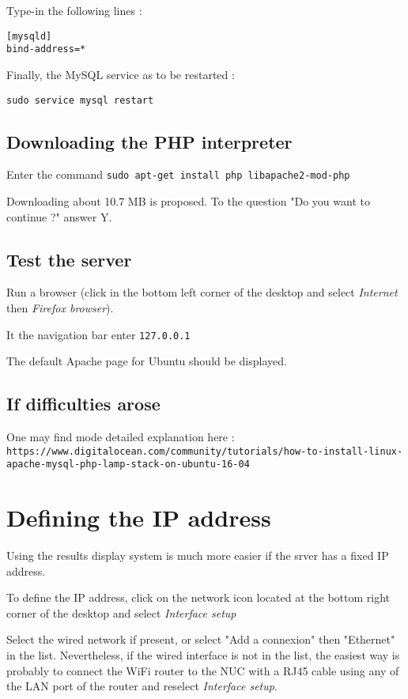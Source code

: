 \documentclass[a4paper]{ffco-rapport}
\begin{document}
		Type-in the following lines :

			\begin{verbatim}
[mysqld]
bind-address=*
			\end{verbatim}
		
		Finally, the MySQL service as to be restarted :
		
		\verb|sudo service mysql restart|

	\subsection{Downloading the PHP interpreter}

		Enter the command \verb|sudo apt-get install php libapache2-mod-php|

		Downloading about 10.7 MB is proposed. To the question "Do you want to continue ?" answer Y.
		
	\subsection{Test the server}
		Run a browser (click in the bottom left corner of the desktop and select \emph{Internet} then \emph{Firefox browser}).

		It the navigation bar enter \verb|127.0.0.1|
		
		The default Apache page for Ubuntu should be displayed.

	\subsection{If difficulties arose}
	
	One may find mode detailed explanation here : \newline
	\scriptsize{\verb|https://www.digitalocean.com/community/tutorials/how-to-install-linux-apache-mysql-php-lamp-stack-on-ubuntu-16-04|}
	\normalsize

\section{Defining the IP address}
	Using the results display system is much more easier if the srver has a fixed IP address.

	To define the IP address, click on the network icon located at the bottom right corner of the desktop and select \emph{Interface setup}

	Select the wired network if present, or select "Add a connexion" then "Ethernet" in the list. Nevertheless, if the wired interface is not in the list, the easiest way is probably to connect the WiFi router to the NUC with a RJ45 cable using any of the LAN port of the router and reselect \emph{Interface setup}.
\end{document}
